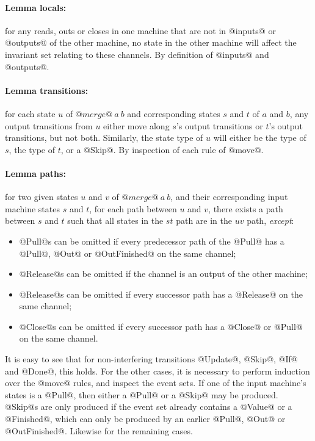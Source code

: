 \paragraph{Lemma locals:} for any reads, outs or closes in one machine that are not in @inputs@ or @outputs@ of the other machine, no state in the other machine will affect the invariant set relating to these channels.
By definition of @inputs@ and @outputs@.

\paragraph{Lemma transitions:} for each state $u$ of $@merge@~a~b$ and corresponding states $s$ and $t$ of $a$ and $b$, any output transitions from $u$ either move along $s$'s output transitions or $t$'s output transitions, but not both.
Similarly, the state type of $u$ will either be the type of $s$, the type of $t$, or a @Skip@.
By inspection of each rule of @move@.

\paragraph{Lemma paths:} for two given states $u$ and $v$ of $@merge@~a~b$, and their corresponding input machine states $s$ and $t$, for each path between $u$ and $v$, there exists a path between $s$ and $t$ such that all states in the $st$ path are in the $uv$ path, \emph{except}:
\begin{itemize}
\item @Pull@s can be omitted if every predecessor path of the @Pull@ has a @Pull@, @Out@ or @OutFinished@ on the same channel;
\item @Release@s can be omitted if the channel is an output of the other machine;
\item @Release@s can be omitted if every successor path has a @Release@ on the same channel;
\item @Close@s can be omitted if every successor path has a @Close@ or @Pull@ on the same channel.
\end{itemize}

It is easy to see that for non-interfering transitions @Update@, @Skip@, @If@ and @Done@, this holds.
For the other cases, it is necessary to perform induction over the @move@ rules, and inspect the event sets.
If one of the input machine's states is a @Pull@, then either a @Pull@ or a @Skip@ may be produced.
@Skip@s are only produced if the event set already contains a @Value@ or a @Finished@, which can only be produced by an earlier @Pull@, @Out@ or @OutFinished@.
Likewise for the remaining cases.


